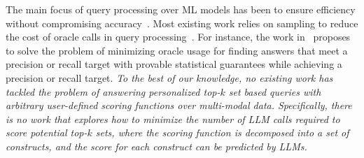 The main focus of query processing over ML models has been to ensure efficiency without compromising accuracy~\cite{9094012,DBLP:journals/pvldb/DingAL22,DBLP:journals/pvldb/KangEABZ17}. 
Most existing work relies on sampling to reduce the cost of oracle calls in query processing~\cite{DBLP:journals/pvldb/DingAL22,DBLP:journals/pvldb/KangGBHZ20,DBLP:conf/sigmod/GaoXAY21,10.1145/3448016.3452786}.
For instance, the work in~\cite{DBLP:journals/pvldb/DingAL22} proposes to solve the problem of minimizing  oracle usage for finding answers that meet a precision or recall target with provable statistical guarantees while achieving a precision or recall target. {\em To the best of our knowledge, no existing work has tackled the problem of answering personalized top-$k$ set based queries with arbitrary user-defined scoring functions over multi-modal data. Specifically, there is no work that explores how to minimize the number of LLM calls required to score potential top-$k$ sets, where the scoring function is decomposed into a set of constructs, and the score for each construct can be predicted by LLMs.} 
\begin{comment}
Another line develops adaptive predictions for NNs by pruning examples based on their classification  in early layers~\cite{DBLP:conf/icml/BolukbasiWDS17}. Another line of work advocates the use of cheap \textit{proxy} models that approximate ground truth oracle labels. 
Proxies are small neural models that either provide a confidence score~\cite{DBLP:journals/pvldb/KangGBHZ20,10.14778/3547305.3547310,DBLP:conf/sigmod/LuCKC18} or distribution~\cite{10.1145/3448016.3452786} for their predicted labels.
Probabilistic predicates (PP)~\cite{DBLP:conf/sigmod/LuCKC18} and CORE~\cite{10.14778/3547305.3547310} employ light-weight proxies to filter out unpromising entities in the DB and empirically improve data reduction rates in query execution plans. Probabilistic top-$k$~\cite{10.1145/3448016.3452786} trains proxy models to generate oracle label distribution and delivers approximate top-$k$ solutions. 
More recently, in~\cite{DBLP:journals/pvldb/KangGBHZ20}, the authors study queries with a minimum precision target (PT) or recall target (RT), and a fixed user-specified budget on the number of oracle calls. However, (i) setting an oracle budget is hard to get right. 
\end{comment}

